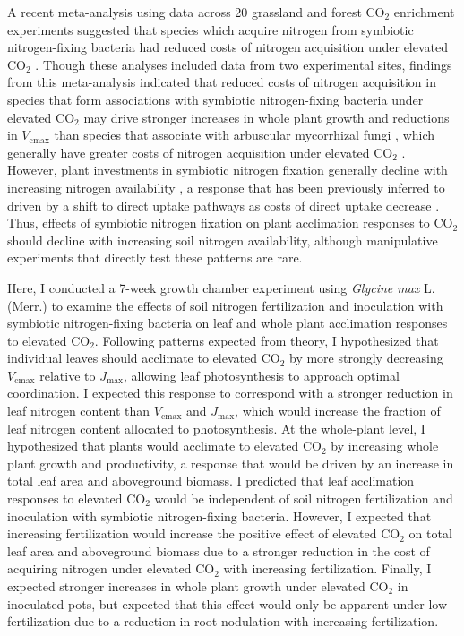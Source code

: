 A recent meta-analysis using data across 20 grassland and forest CO$_2$ enrichment experiments suggested that species which acquire nitrogen from symbiotic nitrogen-fixing bacteria had reduced costs of nitrogen acquisition under elevated CO$_2$ . Though these analyses included data from two experimental sites, findings from this meta-analysis indicated that reduced costs of nitrogen acquisition in species that form associations with symbiotic nitrogen-fixing bacteria under elevated CO$_2$ may drive stronger increases in whole plant growth and reductions in $V_\mathrm{cmax}$ than species that associate with arbuscular mycorrhizal fungi , which generally have greater costs of nitrogen acquisition under elevated CO$_2$ . However, plant investments in symbiotic nitrogen fixation generally decline with increasing nitrogen availability , a response that has been previously inferred to driven by a shift to direct uptake pathways as costs of direct uptake decrease . Thus, effects of symbiotic nitrogen fixation on plant acclimation responses to CO$_2$ should decline with increasing soil nitrogen availability, although manipulative experiments that directly test these patterns are rare.

Here, I conducted a 7-week growth chamber experiment using \textit{Glycine max} L. (Merr.) to examine the effects of soil nitrogen fertilization and inoculation with symbiotic nitrogen-fixing bacteria on leaf and whole plant acclimation responses to elevated CO$_2$. Following patterns expected from theory, I hypothesized that individual leaves should acclimate to elevated CO$_2$ by more strongly decreasing $V_\mathrm{cmax}$ relative to $J_\mathrm{max}$, allowing leaf photosynthesis to approach optimal coordination. I expected this response to correspond with a stronger reduction in leaf nitrogen content than $V_\mathrm{cmax}$ and $J_\mathrm{max}$, which would increase the fraction of leaf nitrogen content allocated to photosynthesis. At the whole-plant level, I hypothesized that plants would acclimate to elevated CO$_2$ by increasing whole plant growth and productivity, a response that would be driven by an increase in total leaf area and aboveground biomass. I predicted that leaf acclimation responses to elevated CO$_2$ would be independent of soil nitrogen fertilization and inoculation with symbiotic nitrogen-fixing bacteria. However, I expected that increasing fertilization would increase the positive effect of elevated CO$_2$ on total leaf area and aboveground biomass due to a stronger reduction in the cost of acquiring nitrogen under elevated CO$_2$ with increasing fertilization. Finally, I expected stronger increases in whole plant growth under elevated CO$_2$ in inoculated pots, but expected that this effect would only be apparent under low fertilization due to a reduction in root nodulation with increasing fertilization.

